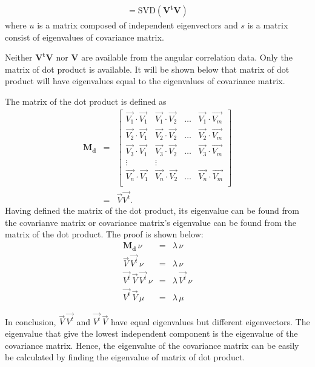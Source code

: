 \begin{eqnarray}
[u \, s \, v ]=\mbox{SVD}(\mathbf{V^{t}}\mathbf{V})
\end{eqnarray} 
where $u$ is a matrix composed of independent eigenvectors and $s$ is a matrix consist of eigenvalues of covariance matrix. 

Neither $\mathbf{V^{t}}\mathbf{V}$ nor $\mathbf{V}$ are available from the angular correlation data. Only the matrix of dot product is available. It will be shown below that matrix of dot product will have eigenvalues equal to the eigenvalues of covariance matrix. 

The matrix of the dot product is defined as
\begin{eqnarray}
\mathbf{M_{d}} &=& 
\begin{bmatrix}
\vec{V_{1}}\cdot\vec{V_{1}} &\vec{V_{1}}\cdot\vec{V_{2}} & \ldots & \vec{V_{1}}\cdot\vec{V_{m}} \\
\vec{V_{2}}\cdot\vec{V_{1}} &\vec{V_{2}}\cdot\vec{V_{2}} & \ldots & \vec{V_{2}}\cdot\vec{V_{m}} \\
\vec{V_{3}}\cdot\vec{V_{1}} &\vec{V_{3}}\cdot\vec{V_{2}} & \ldots & \vec{V_{3}}\cdot\vec{V_{m}} \\
\vdots & \vdots \\
\vec{V_{n}}\cdot\vec{V_{1}} &\vec{V_{n}}\cdot\vec{V_{2}} & \ldots & \vec{V_{n}}\cdot\vec{V_{m}} \\
\end{bmatrix}
\\
&=& \vec{V} \vec{V^{t}}.
\end{eqnarray}
Having defined the matrix of the dot product, its eigenvalue can be found from the covarianve matrix or covariance matrix's eigenvalue can be found from the matrix of the dot product. The proof is shown below: 
\begin{eqnarray}
\mathbf{M_{d}} \, \nu &=& \lambda \, \nu \\ \nonumber
\vec{V} \, \vec{V^{t}} \, \nu &=& \lambda \, \nu \\ \nonumber
\vec{V^{t}} \, \vec{V} \, \vec{V^{t}} \, \nu &=& \lambda \, \vec{V^{t}}\, \nu \\ \nonumber
\vec{V^{t}} \, \vec{V} \, \mu &=& \lambda \, \mu 
\label{eq:matrixofdotproduct}
\end{eqnarray}

In conclusion, $\vec{V} \, \vec{V^{t}}$ and $\vec{V^{t}} \, \vec{V}$ have equal eigenvalues but different eigenvectors. The eigenvalue that give the lowest independent component is the eigenvalue of the covariance matrix. Hence, the eigenvalue of the covariance matrix can be easily be calculated by finding the eigenvalue of matrix of dot product. 


